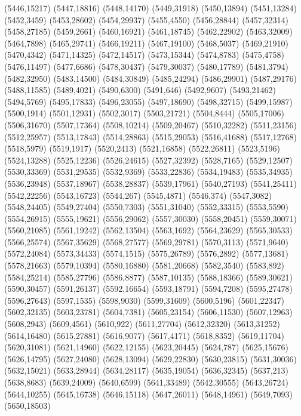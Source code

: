 (5446,15217)
(5447,18816)
(5448,14170)
(5449,31918)
(5450,13894)
(5451,13284)
(5452,3459)
(5453,28602)
(5454,29937)
(5455,4550)
(5456,28844)
(5457,32314)
(5458,27185)
(5459,2661)
(5460,16921)
(5461,18745)
(5462,22902)
(5463,32009)
(5464,7898)
(5465,29741)
(5466,19211)
(5467,19100)
(5468,5037)
(5469,21910)
(5470,4342)
(5471,14325)
(5472,14517)
(5473,15344)
(5474,8783)
(5475,4758)
(5476,11497)
(5477,6686)
(5478,30437)
(5479,30037)
(5480,17789)
(5481,3794)
(5482,32950)
(5483,14500)
(5484,30849)
(5485,24294)
(5486,29901)
(5487,29176)
(5488,11585)
(5489,4021)
(5490,6300)
(5491,646)
(5492,9607)
(5493,21462)
(5494,5769)
(5495,17833)
(5496,23055)
(5497,18690)
(5498,32715)
(5499,15987)
(5500,1914)
(5501,12931)
(5502,3017)
(5503,21721)
(5504,8444)
(5505,17006)
(5506,31670)
(5507,17364)
(5508,10214)
(5509,20467)
(5510,32282)
(5511,23156)
(5512,25957)
(5513,17843)
(5514,28863)
(5515,29053)
(5516,41688)
(5517,12768)
(5518,5979)
(5519,1917)
(5520,2413)
(5521,16858)
(5522,26811)
(5523,5196)
(5524,13288)
(5525,12236)
(5526,24615)
(5527,32392)
(5528,7165)
(5529,12507)
(5530,33369)
(5531,29535)
(5532,9369)
(5533,22836)
(5534,19483)
(5535,34935)
(5536,23948)
(5537,18967)
(5538,28837)
(5539,17961)
(5540,27193)
(5541,25411)
(5542,22256)
(5543,16723)
(5544,267)
(5545,4871)
(5546,374)
(5547,3082)
(5548,24405)
(5549,27404)
(5550,7303)
(5551,31040)
(5552,33315)
(5553,5590)
(5554,26915)
(5555,19621)
(5556,29062)
(5557,30030)
(5558,20451)
(5559,30071)
(5560,21085)
(5561,19242)
(5562,13504)
(5563,1692)
(5564,23629)
(5565,30533)
(5566,25574)
(5567,35629)
(5568,27577)
(5569,29781)
(5570,3113)
(5571,9640)
(5572,24084)
(5573,34433)
(5574,1515)
(5575,26789)
(5576,2892)
(5577,13681)
(5578,21663)
(5579,10394)
(5580,16880)
(5581,20668)
(5582,3540)
(5583,892)
(5584,25214)
(5585,27796)
(5586,8877)
(5587,10135)
(5588,18366)
(5589,30621)
(5590,30457)
(5591,26137)
(5592,16654)
(5593,18791)
(5594,7208)
(5595,27478)
(5596,27643)
(5597,1535)
(5598,9030)
(5599,31609)
(5600,5196)
(5601,22347)
(5602,32135)
(5603,23781)
(5604,7381)
(5605,23154)
(5606,11530)
(5607,12963)
(5608,2943)
(5609,4561)
(5610,922)
(5611,27704)
(5612,32320)
(5613,31252)
(5614,16480)
(5615,27881)
(5616,9077)
(5617,4171)
(5618,8352)
(5619,11704)
(5620,31081)
(5621,14960)
(5622,12155)
(5623,20445)
(5624,787)
(5625,15676)
(5626,14795)
(5627,24080)
(5628,13094)
(5629,22830)
(5630,23815)
(5631,30036)
(5632,15021)
(5633,28944)
(5634,28117)
(5635,19054)
(5636,32345)
(5637,213)
(5638,8683)
(5639,24009)
(5640,6599)
(5641,33489)
(5642,30555)
(5643,26724)
(5644,10255)
(5645,16738)
(5646,15118)
(5647,26011)
(5648,14961)
(5649,7093)
(5650,18503)
